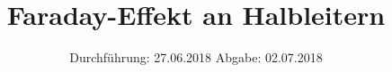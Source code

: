 

\subject{VERSUCH NUMMER 46}
\title{Faraday-Effekt an Halbleitern}
\date{
  Durchführung: 27.06.2018
  \hspace{3em}
  Abgabe: 02.07.2018
}



\thispagestyle{empty}
\maketitle
\thispagestyle{empty}
\tableofcontents
\newpage
\setcounter{page}{1}


% 




\nocite{*}
\printbibliography


